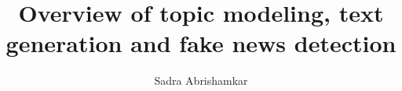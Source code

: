 \documentclass[a4paper,12pt,twoside]{report}
\begin{document}
\title{\LARGE {\bf Overview of topic modeling, text generation and fake news detection}\\
 \vspace*{6mm}
}

\author{Sadra Abrishamkar}

\normallinespacing
\maketitle

\preface
% 

% 
% 

\body





% 







% 

% 

\end{document}
